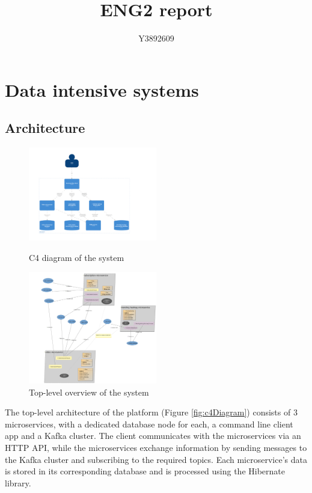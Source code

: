 \documentclass[parskip=full]{article}
\begin{document}
    \title{ENG2 report}
    \author{Y3892609}
    \date{}
    \maketitle
    \tableofcontents
    \pagebreak
    \section{Data intensive systems}
    \subsection{Architecture}
    \begin{figure}
        \includegraphics[width=0.5\textwidth]{c4-diagram-top-level}
        \caption{C4 diagram of the system}
        \label{fig:c4Diagram}
        \vspace{8em}
        \includegraphics[width=0.5\textwidth]{video-platform-top-level-sirius}
        \caption{Top-level overview of the system}
        \label{fig:siriusSystemOverview}
    \end{figure}

    The top-level architecture of the platform (Figure \ref{fig:c4Diagram}) consists of 3 microservices, with a dedicated database node for each, a command line client app and a Kafka cluster.
    The client communicates with the microservices via an HTTP API, while the microservices exchange information by sending messages to the Kafka cluster and subscribing to the required topics.
    Each microservice's data is stored in its corresponding database and is processed using the Hibernate library.
\end{document}
